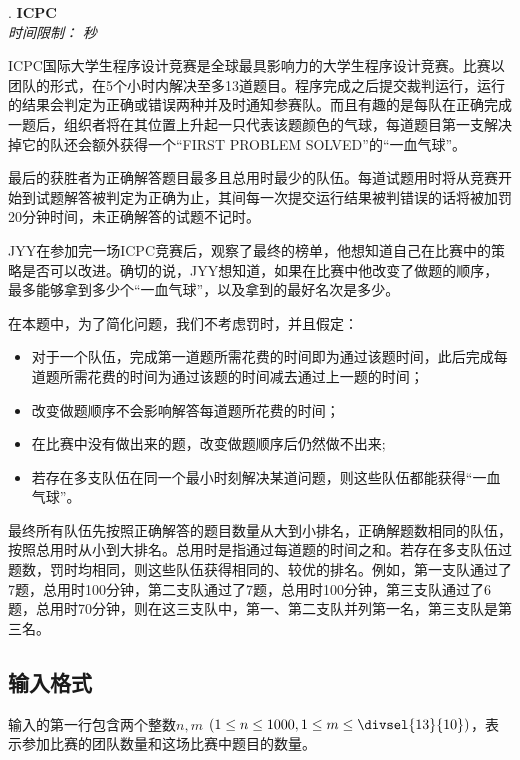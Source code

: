 \addtocounter{ProblemNo}{1}
\renewcommand{\ProblemName}{ICPC}
\begin{center}
\huge{. \textbf{\ProblemName}} \\ [0.8cm]
\large{\textit{时间限制：}  \textit{秒}} \\ [1cm]
\end{center}

ICPC国际大学生程序设计竞赛是全球最具影响力的大学生程序设计竞赛。比赛以团队的形式，在5个小时内解决至多13道题目。程序完成之后提交裁判运行，运行的结果会判定为正确或错误两种并及时通知参赛队。而且有趣的是每队在正确完成一题后，组织者将在其位置上升起一只代表该题颜色的气球，每道题目第一支解决掉它的队还会额外获得一个“FIRST PROBLEM SOLVED”的“一血气球”。

最后的获胜者为正确解答题目最多且总用时最少的队伍。每道试题用时将从竞赛开始到试题解答被判定为正确为止，其间每一次提交运行结果被判错误的话将被加罚20分钟时间，未正确解答的试题不记时。

JYY在参加完一场ICPC竞赛后，观察了最终的榜单，他想知道自己在比赛中的策略是否可以改进。确切的说，JYY想知道，如果在比赛中他改变了做题的顺序，最多能够拿到多少个“一血气球”，以及拿到的最好名次是多少。

在本题中，为了简化问题，我们不考虑罚时，并且假定：
\begin{itemize}
\item 对于一个队伍，完成第一道题所需花费的时间即为通过该题时间，此后完成每道题所需花费的时间为通过该题的时间减去通过上一题的时间；
\item 改变做题顺序不会影响解答每道题所花费的时间；
\item 在比赛中没有做出来的题，改变做题顺序后仍然做不出来;
\item 若存在多支队伍在同一个最小时刻解决某道问题，则这些队伍都能获得“一血气球”。
\end{itemize}

最终所有队伍先按照正确解答的题目数量从大到小排名，正确解题数相同的队伍，按照总用时从小到大排名。总用时是指通过每道题的时间之和。若存在多支队伍过题数，罚时均相同，则这些队伍获得相同的、较优的排名。例如，第一支队通过了7题，总用时100分钟，第二支队通过了7题，总用时100分钟，第三支队通过了6题，总用时70分钟，则在这三支队中，第一、第二支队并列第一名，第三支队是第三名。

\subsection*{输入格式}

输入的第一行包含两个整数$n, m$ $(1 \leq n \leq 1000, 1 \leq m \leq \divsel{13}{10})$，表示参加比赛的团队数量和这场比赛中题目的数量。

